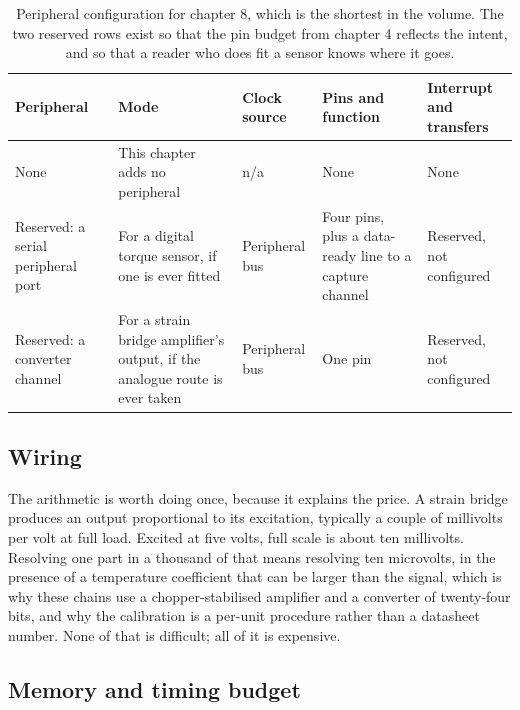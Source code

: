 \begin{table}[H]\centering\small
\begin{tabular}{p{22mm}p{26mm}p{24mm}p{30mm}p{30mm}}
\toprule
Peripheral & Mode & Clock source & Pins and function & Interrupt and transfers \\
\midrule
None & This chapter adds no peripheral & n/a & None & None \\
Reserved: a serial peripheral port & For a digital torque sensor, if one is ever fitted & Peripheral bus & Four pins, plus a data-ready line to a capture channel & Reserved, not configured \\
Reserved: a converter channel & For a strain bridge amplifier's output, if the analogue route is ever taken & Peripheral bus & One pin & Reserved, not configured \\
\bottomrule
\end{tabular}
\caption{Peripheral configuration for chapter 8, which is the shortest in the volume. The two reserved rows exist so that the pin budget from chapter 4 reflects the intent, and so that a reader who does fit a sensor knows where it goes.}
\end{table}

\subsection*{Wiring}


The arithmetic is worth doing once, because it explains the price. A strain
bridge produces an output proportional to its excitation, typically a couple of
millivolts per volt at full load. Excited at five volts, full scale is about ten
millivolts. Resolving one part in a thousand of that means resolving ten
microvolts, in the presence of a temperature coefficient that can be larger than
the signal, which is why these chains use a chopper-stabilised amplifier and a
converter of twenty-four bits, and why the calibration is a per-unit procedure
rather than a datasheet number. None of that is difficult; all of it is
expensive.

\subsection*{Memory and timing budget}


